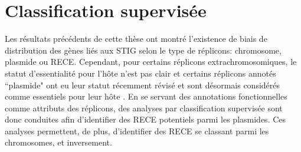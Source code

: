\newpage
\chapter{Classification supervisée}\label{chap6}\label{classifsupervisee}

   
    Les résultats précédents de cette thèse ont montré l'existence de biais de distribution des gènes liés aux STIG selon le type de réplicons: chromosome, plasmide ou RECE. Cependant, pour certains réplicons extrachromosomiques, le statut d'essentialité pour l'hôte n'est pas clair et certains réplicons annotés ``plasmide" ont eu leur statut récemment révisé et sont désormais considérés comme essentiels pour leur hôte \citep{Landeta2011}. En se servant des annotations fonctionnelles comme attributs des réplicons, des analyses par classification supervisée sont donc conduites afin d'identifier des RECE potentiels parmi les plasmides. Ces analyses permettent, de plus, d'identifier des RECE se classant parmi les chromosomes, et inversement. 
     

